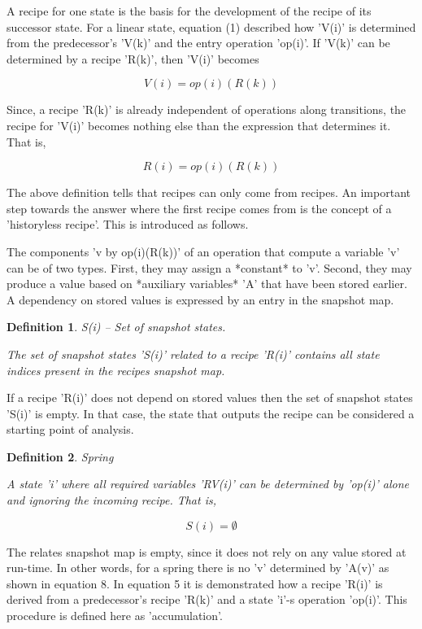 \documentclass[12pt]{article}
\newtheorem{definition}{Definition}
\begin{document}
A recipe for one state is the basis for the development of the recipe of its
successor state. For a linear state, equation (1) described how 'V(i)' is
determined from the predecessor's 'V(k)' and the entry operation 'op(i)'. If
'V(k)' can be determined by a recipe 'R(k)', then 'V(i)' becomes

\[
                     V(i) = op(i)(R(k))                                     
\]

Since, a recipe 'R(k)' is already independent of operations along transitions,
the recipe for 'V(i)' becomes nothing else than the expression that
determines it. That is,

\[
                     R(i) = { op(i)(R(k)) }                                 
\]
                 
The above definition tells that recipes can only come from recipes. An
important step towards the answer where the first recipe comes from is the
concept of a 'historyless recipe'. This is introduced as follows. 

The components 'v by op(i)(R(k))' of an operation that compute a variable 'v'
can be of two types. First, they may assign a *constant* to 'v'. Second, they may
produce a value based on *auxiliary variables* 'A' that have been stored earlier.
A dependency on stored values is expressed by an entry in the snapshot map.

\begin{definition}
S(i) -- Set of snapshot states.

The set of snapshot states 'S(i)' related to a recipe 'R(i)' contains
all state indices present in the recipes snapshot map.
\end{definition}

If a recipe 'R(i)' does not depend on stored values then the set of snapshot
states 'S(i)' is empty. In that case, the state that outputs the recipe can 
be considered a starting point of analysis.

\begin{definition}
Spring

A state 'i' where all required variables 'RV(i)' can be determined by 
'op(i)' alone and ignoring the incoming recipe. That is, 
\end{definition}

\begin{equation}
                          S(i) = \emptyset
\end{equation}

The relates snapshot map is empty, since it does not rely on any value stored
at run-time.  In other words, for a spring there is no 'v' determined by 'A(v)'
as shown in equation 8.  In equation 5 it is demonstrated how a recipe 'R(i)'
is derived from a predecessor's recipe 'R(k)' and a state 'i'-s operation
'op(i)'. This procedure is defined here as 'accumulation'.
\end{document}
